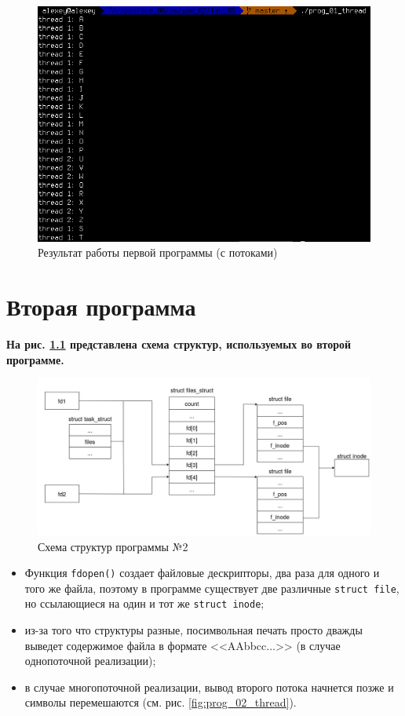 \documentclass[12pt]{report}
\begin{document}
\begin{figure}[H]
	\centering
	\includegraphics[scale=0.6]{img/prog_01_thread.png}
	\caption{Результат работы первой программы (с потоками)}
	\label{fig:prog_01_thread}
\end{figure}

\chapter{Вторая программа}

\textbf{На рис. \ref{fig:prog_02_schema} представлена схема структур, используемых во второй программе.}

\begin{figure}[H]
	\centering
	\includegraphics[scale=0.4]{img/prog_02_schema.jpg}
	\caption{Схема структур программы №2}
	\label{fig:prog_02_schema}
\end{figure}

\begin{itemize}
	\item Функция \texttt{fdopen()} создает файловые дескрипторы, два раза для одного и того же файла, поэтому в программе существует две различные \texttt{struct file}, но ссылающиеся на один и тот же \texttt{struct inode};
	\item из-за того что структуры разные, посимвольная печать просто дважды выведет содержимое файла в формате <<AAbbcc...>> (в случае однопоточной реализации); 
	\item в случае многопоточной реализации, вывод второго потока начнется позже и символы перемешаются (см. рис. \ref{fig:prog_02_thread}).
\end{itemize}
\end{document}
